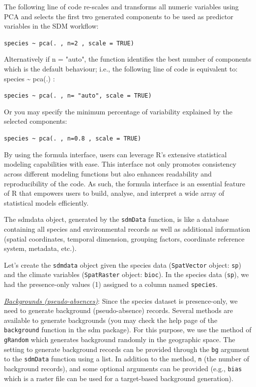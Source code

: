 \documentclass[
]{article}
\begin{document}
\begin{mdframed}[backgroundcolor=gray!10, linecolor=black!75, linewidth=2pt, roundcorner=5pt, shadow=true,frametitle={\textbf{BOX 1: \uline{Formula interface in the sdmData function}}}]
The following line of code re-scales and transforms all numeric variables using PCA and selects the first two generated components to be used as predictor variables in the SDM workflow:
 
\texttt{species \textasciitilde{} pca(. , n=2 , scale = TRUE) }

Alternatively if n = "auto", the function identifies the best number of components which is the default behaviour; i.e., the following line of code is equivalent to: species \textasciitilde{} pca(.) :

\texttt{species \textasciitilde{} pca(. , n= "auto", scale = TRUE)  }

Or you may specify the minimum percentage of variability explained by the selected components:

\texttt{species \textasciitilde{} pca(. , n=0.8 , scale = TRUE) }

By using the formula interface, users can leverage R's extensive statistical modeling capabilities with ease. This interface not only promotes consistency across different modeling functions but also enhances readability and reproducibility of the code. As such, the formula interface is an essential feature of R that empowers users to build, analyse, and interpret a wide array of statistical models efficiently.

\end{mdframed}

The sdmdata object, generated by the \texttt{sdmData} function, is like
a database containing all species and environmental records as well as
additional information (spatial coordinates, temporal dimension,
grouping factors, coordinate reference system, metadata, etc.).

Let's create the \texttt{sdmdata} object given the species data
(\texttt{SpatVector} object: \texttt{sp}) and the climate variables
(\texttt{SpatRaster} object: \texttt{bioc}). In the species data
(\texttt{sp}), we had the presence-only values (1) assigned to a column
named \texttt{species}.

\uline{\textit{Backgrounds (pseudo-absences)}}: Since the species
dataset is presence-only, we need to generate background
(pseudo-absence) records. Several methods are available to generate
backgrounds (you may check the help page of the \texttt{background}
function in the sdm package). For this purpose, we use the method of
\texttt{gRandom} which generates background randomly in the geographic
space. The setting to generate background records can be provided
through the \texttt{bg} argument to the \texttt{sdmData} function using
a list. In addition to the method, \texttt{n} (the number of background
records), and some optional arguments can be provided (e.g.,
\texttt{bias} which is a raster file can be used for a target-based
background generation).
\end{document}

